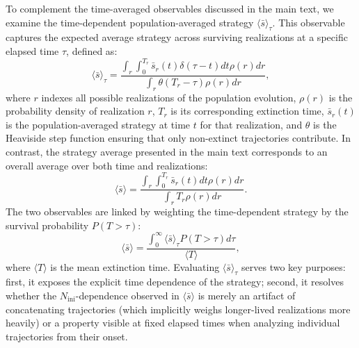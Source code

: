 \documentclass[aps,pre,reprint,10pt,superscriptaddress]{revtex4-2}
\begin{document}
\begin{appendices}
    To complement the time-averaged observables discussed in the main text, we examine the time-dependent population-averaged strategy $\langle\bar{s}\rangle_\tau$. This observable captures the expected average strategy across surviving realizations at a specific elapsed time $\tau$, defined as:
    \begin{equation}
        \langle\bar{s}\rangle_\tau=\frac{\int_r\int_0^{T_r}\bar{s}_r(t)\delta(\tau-t)dt\rho(r)dr}{\int_r\theta(T_r-\tau)\rho(r)dr},
    \end{equation}
    where $r$ indexes all possible realizations of the population evolution, $\rho(r)$ is the probability density of realization $r$, $T_r$ is its corresponding extinction time, $\bar{s}_r(t)$ is the population-averaged strategy at time $t$ for that realization, and $\theta$ is the Heaviside step function ensuring that only non-extinct trajectories contribute. In contrast, the strategy average presented in the main text corresponds to an overall average over both time and realizations:
    \begin{equation}
        \langle\bar{s}\rangle=\frac{\int_r\int_0^{T_r}\bar{s}_r(t)dt\rho(r)dr}{\int_rT_r\rho(r)dr}.
    \end{equation}
    The two observables are linked by weighting the time-dependent strategy by the survival probability $P(T > \tau)$:
    \begin{equation}
        \langle\bar{s}\rangle = \frac{\int_0^\infty\langle\bar{s}\rangle_\tau P(T>\tau)d\tau}{\langle T\rangle},
    \end{equation}
    where $\langle T\rangle$ is the mean extinction time. Evaluating $\langle\bar{s}\rangle_\tau$ serves two key purposes: first, it exposes the explicit time dependence of the strategy; second, it resolves whether the $N_\text{ini}$-dependence observed in $\langle\bar{s}\rangle$ is merely an artifact of concatenating trajectories (which implicitly weighs longer-lived realizations more heavily) or a property visible at fixed elapsed times when analyzing individual trajectories from their onset.


\end{appendices}
\end{document}
